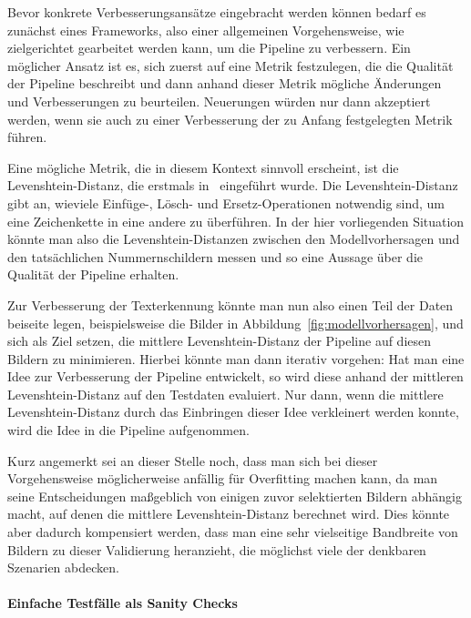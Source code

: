 Bevor konkrete Verbesserungsans\"atze eingebracht werden k\"onnen bedarf
es zun\"achst eines Frameworks, also einer allgemeinen Vorgehensweise,
wie zielgerichtet gearbeitet werden kann, um die Pipeline zu verbessern.
Ein m\"oglicher Ansatz ist es, sich zuerst auf eine Metrik festzulegen,
die die Qualit\"at
der Pipeline beschreibt und dann anhand dieser Metrik m\"ogliche
\"Anderungen und Verbesserungen zu beurteilen.
Neuerungen w\"urden nur dann akzeptiert werden, wenn sie auch zu einer
Verbesserung der zu Anfang festgelegten Metrik f\"uhren.

Eine m\"ogliche Metrik, die in diesem Kontext sinnvoll erscheint,
ist die Levenshtein-Distanz, die erstmals in~\cite{levenshtein}
eingef\"uhrt wurde.
Die Levenshtein-Distanz gibt an, wieviele Einf\"uge-, L\"osch- und
Ersetz-Operationen notwendig sind, um eine Zeichenkette in eine
andere zu \"uberf\"uhren.
In der hier vorliegenden Situation k\"onnte man also die
Levenshtein-Distanzen zwischen den Modellvorhersagen und den
tats\"achlichen Nummernschildern messen und so eine Aussage \"uber
die Qualit\"at der Pipeline erhalten.

Zur Verbesserung der Texterkennung k\"onnte man nun also einen Teil der
Daten beiseite legen, beispielsweise die Bilder in Abbildung~\ref{fig:modellvorhersagen},
und sich als Ziel setzen, die mittlere Levenshtein-Distanz der
Pipeline auf diesen Bildern zu minimieren.
Hierbei k\"onnte man dann iterativ vorgehen: Hat man eine Idee zur
Verbesserung der Pipeline entwickelt, so wird diese anhand der
mittleren Levenshtein-Distanz auf den Testdaten evaluiert.
Nur dann, wenn die mittlere Levenshtein-Distanz durch das Einbringen
dieser Idee verkleinert werden konnte, wird die Idee in die Pipeline
aufgenommen.

Kurz angemerkt sei an dieser Stelle noch, dass man sich bei dieser
Vorgehensweise m\"oglicherweise anf\"allig f\"ur Overfitting
machen kann, da man seine Entscheidungen ma{\ss}geblich von einigen zuvor
selektierten Bildern abh\"angig macht, auf denen die mittlere
Levenshtein-Distanz berechnet wird.
Dies k\"onnte aber dadurch kompensiert werden, dass man eine sehr
vielseitige Bandbreite von Bildern zu dieser Validierung heranzieht,
die m\"oglichst viele der denkbaren Szenarien abdecken.

\paragraph{Einfache Testf\"alle als \glqq Sanity Checks\grqq{}}


